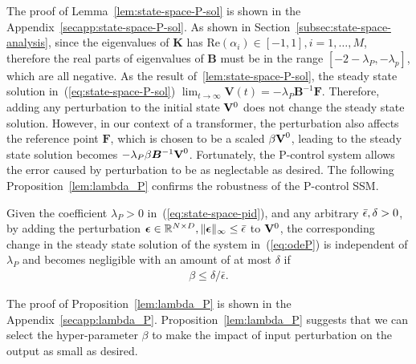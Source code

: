 The proof of Lemma~\ref{lem:state-space-P-sol} is shown in the Appendix~\ref{secapp:state-space-P-sol}. As shown in Section~\ref{subsec:state-space-analysis}, since the eigenvalues of $\bm{K}$ has $\mathrm{Re}(\alpha_i) \in [-1, 1], i = 1, \dots, M$, therefore the real parts of eigenvalues of $\bm{B}$ must be in the range $[-2 - \lambda_P, -\lambda_p]$, which are all negative. As the result of~\ref{lem:state-space-P-sol}, the steady state solution in~(\ref{eq:state-space-P-sol}) $\lim_{t \to \infty}\bm{V}(t) = -\lambda_P\bm{B}^{-1}\bm{F}$. Therefore, adding any perturbation to the initial state ${\mathbf V}^0$ does not change the steady state solution. However, in our context of a transformer, the perturbation also affects the reference point $\bm{F}$, which is chosen to be a scaled $\beta\bm{{\mathbf V}}^0$, leading to the steady state solution becomes $-\lambda_P\beta\bm{B}^{-1}\bm{{\mathbf V}}^0$. Fortunately, the P-control system allows the error caused by perturbation to be as neglectable as desired. The following Proposition~\ref{lem:lambda_P} confirms the robustness of the P-control SSM.
\begin{proposition}
\label{lem:lambda_P}
    Given the coefficient $\lambda_P > 0$ in~(\ref{eq:state-space-pid}), and any arbitrary $\Bar{\epsilon}, \delta > 0$, by adding  the perturbation $\bm{\epsilon} \in \mathbb{R}^{N \times D}, \| \bm{\epsilon} \|_{\infty} \leq \Bar{\epsilon}$ to ${\mathbf V}^0$, the corresponding change in the steady state solution of the system in~(\ref{eq:odeP}) is independent of $\lambda_P$ and becomes negligible with an amount of at most $\delta$ if 
    \begin{align}
        \beta \leq {\delta}/{\bar{\epsilon}}.
    \end{align}
\end{proposition}
\vspace{-2mm}
The proof of Proposition~\ref{lem:lambda_P} is shown in the Appendix~\ref{secapp:lambda_P}.
Proposition~\ref{lem:lambda_P} suggests that we can select the hyper-parameter $\beta$ to make the impact of input perturbation on the output as small as desired.

